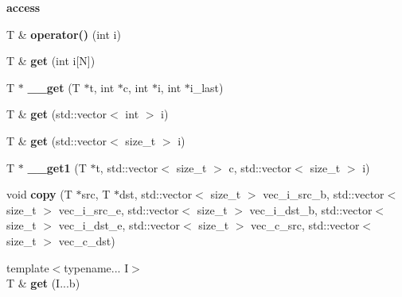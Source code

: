 \begin{Indent}{\bf access}\par
{\em \label{_amgrp9df3b01c60df20d13843841ff0d4482c}
 }\begin{DoxyCompactItemize}
\item 
\hypertarget{class____array_a2640e620004e448f2c9d70e2d048c91e}{
T \& {\bfseries operator()} (int i)}
\label{class____array_a2640e620004e448f2c9d70e2d048c91e}

\item 
\hypertarget{class____array_ab8aa25dbb4bf56dd2df5dca22112deaf}{
T \& {\bfseries get} (int i\mbox{[}N\mbox{]})}
\label{class____array_ab8aa25dbb4bf56dd2df5dca22112deaf}

\item 
\hypertarget{class____array_a048dc1381c0a2e3b8b07d487b6e429b1}{
T $\ast$ {\bfseries \_\-\_\-get} (T $\ast$t, int $\ast$c, int $\ast$i, int $\ast$i\_\-last)}
\label{class____array_a048dc1381c0a2e3b8b07d487b6e429b1}

\item 
\hypertarget{class____array_ac7d5ddda5112a815aef1b8ac55fb3d87}{
T \& {\bfseries get} (std::vector$<$ int $>$ i)}
\label{class____array_ac7d5ddda5112a815aef1b8ac55fb3d87}

\item 
\hypertarget{class____array_a6417fe5f1aa72b28ad1fb5b10a0fb9ad}{
T \& {\bfseries get} (std::vector$<$ size\_\-t $>$ i)}
\label{class____array_a6417fe5f1aa72b28ad1fb5b10a0fb9ad}

\item 
\hypertarget{class____array_a4c097ee9f07cfd581c8d16089a4a6563}{
T $\ast$ {\bfseries \_\-\_\-get1} (T $\ast$t, std::vector$<$ size\_\-t $>$ c, std::vector$<$ size\_\-t $>$ i)}
\label{class____array_a4c097ee9f07cfd581c8d16089a4a6563}

\item 
\hypertarget{class____array_a499808e1977bdb4e3dcb562eb70d67da}{
void {\bfseries copy} (T $\ast$src, T $\ast$dst, std::vector$<$ size\_\-t $>$ vec\_\-i\_\-src\_\-b, std::vector$<$ size\_\-t $>$ vec\_\-i\_\-src\_\-e, std::vector$<$ size\_\-t $>$ vec\_\-i\_\-dst\_\-b, std::vector$<$ size\_\-t $>$ vec\_\-i\_\-dst\_\-e, std::vector$<$ size\_\-t $>$ vec\_\-c\_\-src, std::vector$<$ size\_\-t $>$ vec\_\-c\_\-dst)}
\label{class____array_a499808e1977bdb4e3dcb562eb70d67da}

\item 
\hypertarget{class____array_a7fb64a0fa23884f3178a913ab3a09f58}{
{\footnotesize template$<$typename... I$>$ }\\T \& {\bfseries get} (I...b)}
\label{class____array_a7fb64a0fa23884f3178a913ab3a09f58}


\end{DoxyCompactItemize}
\end{Indent}
